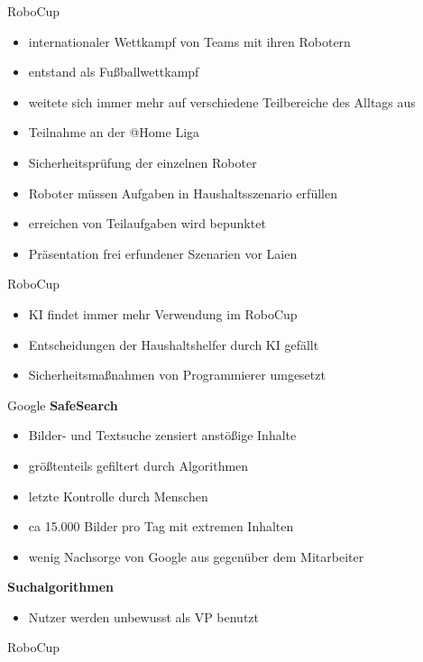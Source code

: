 \documentclass[10pt]{beamer}
\begin{document}
		\begin{frame}{RoboCup}
			\begin{itemize}
				\item internationaler Wettkampf von Teams mit ihren Robotern
				\item entstand als Fußballwettkampf
				\item weitete sich immer mehr auf verschiedene Teilbereiche des Alltags aus
				\item Teilnahme an der @Home Liga
				\item Sicherheitsprüfung der einzelnen Roboter
				\item Roboter müssen Aufgaben in Haushaltsszenario erfüllen
				\item erreichen von Teilaufgaben wird bepunktet
				\item Präsentation frei erfundener Szenarien vor Laien 
			\end{itemize}
		\end{frame}
			\begin{frame}{RoboCup}
				\begin{itemize}
					\item KI findet immer mehr Verwendung im RoboCup
					\item Entscheidungen der Haushaltshelfer durch KI gefällt
					\item Sicherheitsmaßnahmen von Programmierer umgesetzt
				\end{itemize}
			\end{frame}
			\begin{frame}{Google}
				\textbf{SafeSearch}
				\begin{itemize}
					\item Bilder- und Textsuche zensiert anstößige Inhalte
					\item größtenteils gefiltert durch Algorithmen
					\item letzte Kontrolle durch Menschen
					\item ca 15.000 Bilder pro Tag mit extremen Inhalten
					\item wenig Nachsorge von Google aus gegenüber dem Mitarbeiter
				\end{itemize}
				\textbf{Suchalgorithmen}
				\begin{itemize}
					\item Nutzer werden unbewusst als VP benutzt
				\end{itemize}
			\end{frame}
	
	\begin{frame}{RoboCup}
		
	\end{frame}
\end{document}
